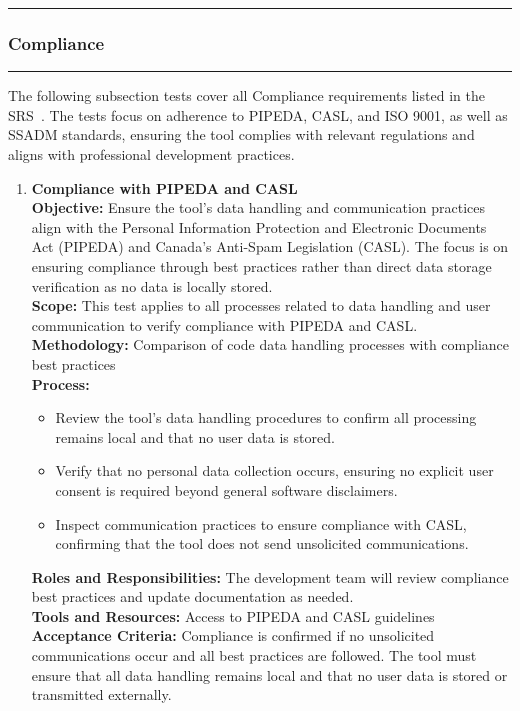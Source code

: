 \documentclass[12pt, titlepage]{article}
\newcommand{\colorrule}{\textcolor{BlueViolet}{\rule{\linewidth}{2pt}}}
\begin{document}
  \newpage
  \noindent
  \colorrule

  \subsubsection{Compliance}
  \colorrule

  \medskip

  \noindent
  The following subsection tests cover all Compliance requirements
  listed in the SRS~\cite{SRS}. The tests focus on adherence to
  PIPEDA, CASL, and ISO 9001, as well as SSADM standards, ensuring
  the tool complies with relevant regulations and aligns with
  professional development practices.

  \begin{enumerate}[label={\bf
      \textcolor{Maroon}{test-CPL-\arabic*}}, wide=0pt, font=\itshape]
    \item \textbf{Compliance with PIPEDA and CASL} \\[2mm]
      \textbf{Objective:} Ensure the tool’s data handling and
      communication practices align with the Personal Information
      Protection and Electronic Documents Act (PIPEDA) and Canada’s
      Anti-Spam Legislation (CASL). The focus is on ensuring
      compliance through best practices rather than direct data
      storage verification as no data is locally stored. \\[2mm]
      \textbf{Scope:} This test applies to all processes related to
      data handling and user communication to verify compliance with
      PIPEDA and CASL. \\[2mm]
      \textbf{Methodology:} Comparison of code data handling
      processes with compliance best practices \\[2mm]
      \textbf{Process:}
      \begin{itemize}
        \item Review the tool’s data handling procedures to confirm
          all processing remains local and that no user data is stored.
        \item Verify that no personal data collection occurs,
          ensuring no explicit user consent is required beyond
          general software disclaimers.
        \item Inspect communication practices to ensure compliance
          with CASL, confirming that the tool does not send
          unsolicited communications.
      \end{itemize}
      \textbf{Roles and Responsibilities:} The development team will
      review compliance best practices and update documentation as
      needed. \\[2mm]
      \textbf{Tools and Resources:} Access to PIPEDA and CASL guidelines \\[2mm]
      \textbf{Acceptance Criteria:} Compliance is confirmed if no
      unsolicited communications occur and all best practices are
      followed. The tool must ensure that all data handling remains
      local and that no user data is stored or transmitted externally.


\end{enumerate}
\end{document}
